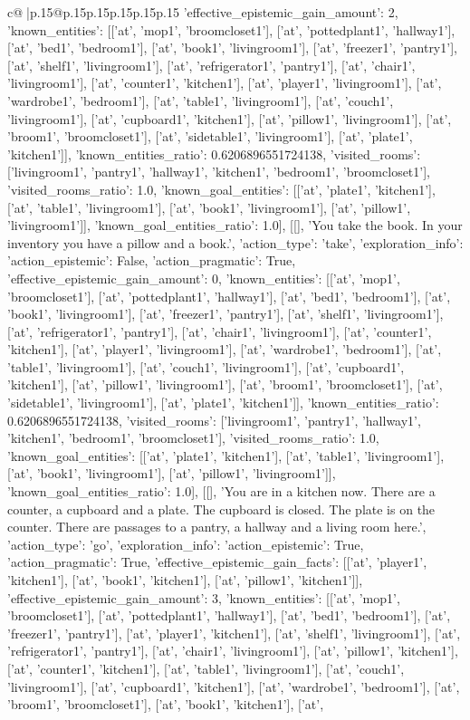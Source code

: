 \documentclass{article}
\begin{document}
{\begin{supertabular}{c@{$\;$}|p{.15\linewidth}@{}p{.15\linewidth}p{.15\linewidth}p{.15\linewidth}p{.15\linewidth}p{.15\linewidth}}
{{{'effective_epistemic_gain_amount': 2, 'known_entities': [['at', 'mop1', 'broomcloset1'], ['at', 'pottedplant1', 'hallway1'], ['at', 'bed1', 'bedroom1'], ['at', 'book1', 'livingroom1'], ['at', 'freezer1', 'pantry1'], ['at', 'shelf1', 'livingroom1'], ['at', 'refrigerator1', 'pantry1'], ['at', 'chair1', 'livingroom1'], ['at', 'counter1', 'kitchen1'], ['at', 'player1', 'livingroom1'], ['at', 'wardrobe1', 'bedroom1'], ['at', 'table1', 'livingroom1'], ['at', 'couch1', 'livingroom1'], ['at', 'cupboard1', 'kitchen1'], ['at', 'pillow1', 'livingroom1'], ['at', 'broom1', 'broomcloset1'], ['at', 'sidetable1', 'livingroom1'], ['at', 'plate1', 'kitchen1']], 'known_entities_ratio': 0.6206896551724138, 'visited_rooms': ['livingroom1', 'pantry1', 'hallway1', 'kitchen1', 'bedroom1', 'broomcloset1'], 'visited_rooms_ratio': 1.0, 'known_goal_entities': [['at', 'plate1', 'kitchen1'], ['at', 'table1', 'livingroom1'], ['at', 'book1', 'livingroom1'], ['at', 'pillow1', 'livingroom1']], 'known_goal_entities_ratio': 1.0}}], [[], 'You take the book. In your inventory you have a pillow and a book.', {'action_type': 'take', 'exploration_info': {'action_epistemic': False, 'action_pragmatic': True, 'effective_epistemic_gain_amount': 0, 'known_entities': [['at', 'mop1', 'broomcloset1'], ['at', 'pottedplant1', 'hallway1'], ['at', 'bed1', 'bedroom1'], ['at', 'book1', 'livingroom1'], ['at', 'freezer1', 'pantry1'], ['at', 'shelf1', 'livingroom1'], ['at', 'refrigerator1', 'pantry1'], ['at', 'chair1', 'livingroom1'], ['at', 'counter1', 'kitchen1'], ['at', 'player1', 'livingroom1'], ['at', 'wardrobe1', 'bedroom1'], ['at', 'table1', 'livingroom1'], ['at', 'couch1', 'livingroom1'], ['at', 'cupboard1', 'kitchen1'], ['at', 'pillow1', 'livingroom1'], ['at', 'broom1', 'broomcloset1'], ['at', 'sidetable1', 'livingroom1'], ['at', 'plate1', 'kitchen1']], 'known_entities_ratio': 0.6206896551724138, 'visited_rooms': ['livingroom1', 'pantry1', 'hallway1', 'kitchen1', 'bedroom1', 'broomcloset1'], 'visited_rooms_ratio': 1.0, 'known_goal_entities': [['at', 'plate1', 'kitchen1'], ['at', 'table1', 'livingroom1'], ['at', 'book1', 'livingroom1'], ['at', 'pillow1', 'livingroom1']], 'known_goal_entities_ratio': 1.0}}], [[], 'You are in a kitchen now. There are a counter, a cupboard and a plate. The cupboard is closed. The plate is on the counter. There are passages to a pantry, a hallway and a living room here.', {'action_type': 'go', 'exploration_info': {'action_epistemic': True, 'action_pragmatic': True, 'effective_epistemic_gain_facts': [['at', 'player1', 'kitchen1'], ['at', 'book1', 'kitchen1'], ['at', 'pillow1', 'kitchen1']], 'effective_epistemic_gain_amount': 3, 'known_entities': [['at', 'mop1', 'broomcloset1'], ['at', 'pottedplant1', 'hallway1'], ['at', 'bed1', 'bedroom1'], ['at', 'freezer1', 'pantry1'], ['at', 'player1', 'kitchen1'], ['at', 'shelf1', 'livingroom1'], ['at', 'refrigerator1', 'pantry1'], ['at', 'chair1', 'livingroom1'], ['at', 'pillow1', 'kitchen1'], ['at', 'counter1', 'kitchen1'], ['at', 'table1', 'livingroom1'], ['at', 'couch1', 'livingroom1'], ['at', 'cupboard1', 'kitchen1'], ['at', 'wardrobe1', 'bedroom1'], ['at', 'broom1', 'broomcloset1'], ['at', 'book1', 'kitchen1'], ['at', }}}
\end{supertabular}}
\end{document}
